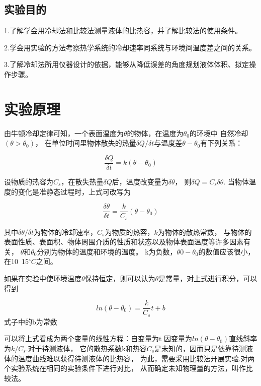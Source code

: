 \documentclass{ctexart}
\begin{document}
  \subsection{实验目的}
  1.\quad 了解学会用冷却法和比较法测量液体的比热容，并了解比较法的使用条件。

  2.\quad 学会用实验的方法考察热学系统的冷却速率同系统与环境间温度差之间的关系。
  
  3.\quad 了解冷却法所用仪器设计的依据，能够从降低误差的角度规划液体体积、拟定操作步骤。

\section{实验原理}
  由牛顿冷却定律可知，一个表面温度为$\theta$的物体，在温度为$\theta_{0}$的环境中
  自然冷却$(\theta > \theta_{0})$，
  在单位时间里物体散失的热量$\delta Q / \delta t$与温度差$\theta - \theta_{0}$有下列关系：

  \begin{equation}
    \frac{\delta Q}{\delta t} = k (\theta - \theta_{0})
  \end{equation}

  设物质的热容为$C_{s}$，在散失热量$\delta Q$后，温度改变量为$\delta \theta$，
  则$\delta Q = C_{s} \delta \theta$.
  当物体温度的变化是准静态过程时，上式可改写为
  
  \begin{equation}
    \frac{\delta \theta}{\delta t} = \frac{k}{C_{s}} (\theta-\theta_{0})
  \end{equation}

  其中$\delta \theta / \delta t$为物体的冷却速率，$C_{s}$为物质的热容，$k$为物体的散热常数，
  与物体的表面性质、表面积、物体周围介质的性质和状态以及物体表面温度等许多因素有关，
  $\theta$和$\theta_{0}$分别为物体的温度和环境的温度。
  k为负数，$\theta 0-\theta_{0}$的数值应该很小，在10~15$^{\circ} C$之间。

  如果在实验中使环境温度$\theta$保持恒定，则可以认为$\theta$是常量，对上式进行积分，可以得到

  \begin{equation}
    ln(\theta - \theta_{0}) = \frac{k}{C_{s}} t + b
  \end{equation}
  式子中的b为常数

  可以将上式看成为两个变量的线性方程：自变量为t
  因变量为$ln(\theta - \theta_{0})$直线斜率为$k/C_{s}$.对于待测液体，
  它的散热系数k和热容$C_{s}$是未知的，因而只是依靠待测液体的温度曲线难以获得待测液体的比热容，
  为此，需要采用比较法开展实验.对两个实验系统在相同的实验条件下进行对比，
  从而确定未知物理量的方法，叫作比较法。
  
\end{document}
